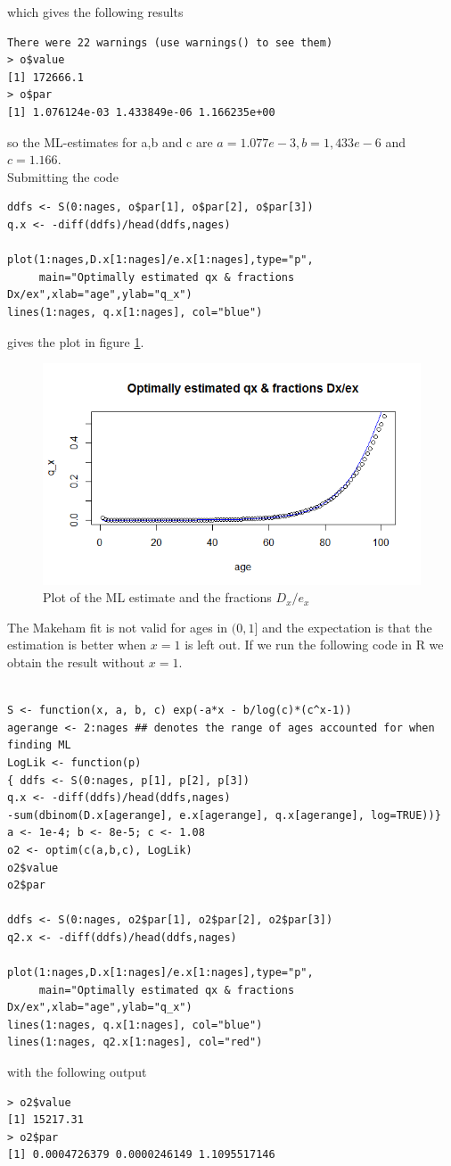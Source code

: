 \documentclass[11pt]{article}
\begin{document}
which gives the following results

\begin{verbatim}
There were 22 warnings (use warnings() to see them)
> o$value
[1] 172666.1
> o$par
[1] 1.076124e-03 1.433849e-06 1.166235e+00
\end{verbatim}
so the ML-estimates for a,b and c are $a = 1.077e-3, b=1,433e-6$ and $c = 1.166$. \\
Submitting the code
\begin{verbatim}
ddfs <- S(0:nages, o$par[1], o$par[2], o$par[3])
q.x <- -diff(ddfs)/head(ddfs,nages)

plot(1:nages,D.x[1:nages]/e.x[1:nages],type="p",
     main="Optimally estimated qx & fractions Dx/ex",xlab="age",ylab="q_x")
lines(1:nages, q.x[1:nages], col="blue")
\end{verbatim}
gives the plot in figure \ref{Figure_Question9_1}.
\begin{center}
\begin{figure}

\includegraphics[scale=1]{Question_9_MakehamGompertz_1.png}

\caption{Plot of the ML estimate and the fractions $D_x/e_x$}
\label{Figure_Question9_1}

\end{figure}
\end{center}

The Makeham fit is not valid for ages in $(0,1]$ and the expectation is that the estimation is better when $x=1$ is left out. If we run the following code in R we obtain the result without $x=1$.
\begin{verbatim}

S <- function(x, a, b, c) exp(-a*x - b/log(c)*(c^x-1))
agerange <- 2:nages ## denotes the range of ages accounted for when finding ML
LogLik <- function(p)
{ ddfs <- S(0:nages, p[1], p[2], p[3])
q.x <- -diff(ddfs)/head(ddfs,nages)
-sum(dbinom(D.x[agerange], e.x[agerange], q.x[agerange], log=TRUE))}
a <- 1e-4; b <- 8e-5; c <- 1.08
o2 <- optim(c(a,b,c), LogLik) 
o2$value
o2$par

ddfs <- S(0:nages, o2$par[1], o2$par[2], o2$par[3])
q2.x <- -diff(ddfs)/head(ddfs,nages)

plot(1:nages,D.x[1:nages]/e.x[1:nages],type="p",
     main="Optimally estimated qx & fractions Dx/ex",xlab="age",ylab="q_x")
lines(1:nages, q.x[1:nages], col="blue")
lines(1:nages, q2.x[1:nages], col="red")

\end{verbatim}

with the following output

\begin{verbatim}
> o2$value
[1] 15217.31
> o2$par
[1] 0.0004726379 0.0000246149 1.1095517146
\end{verbatim}
\end{document}
